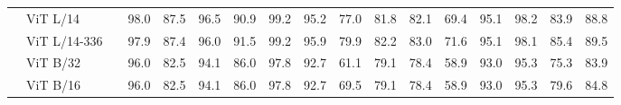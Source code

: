 \documentclass{article} \usepackage{iclr2023_conference,times}
\begin{document}
\begin{table}
{\begin{tabular}{cl|cccccccccccccc|c}
			 & ViT L/14     &  & 98.0                                       & 87.5                                        & 96.5                                          & 90.9                                    & 99.2                                       & 95.2                                       & 77.0                                        & 81.8                                      & 82.1                                   & 69.4                                        & 95.1                                    & 98.2                                       & 83.9                                        & 88.8                                        \\
			 & ViT L/14-336 &  & 97.9                                       & 87.4                                        & 96.0                                          & 91.5                                    & 99.2                                       & 95.9                                       & 79.9                                        & 82.2                                      & 83.0                                   & 71.6                                        & 95.1                                    & 98.1                                       & 85.4                                        & 89.5                                        \\ \midrule \multirow{4}{0em}{\rotatebox[origin=c]{90}{CLIP-R}}
			 & ViT B/32     &  & 96.0                                       & 82.5                                        & 94.1                                          & 86.0                                    & 97.8                                       & 92.7                                       & 61.1                                        & 79.1                                      & 78.4                                   & 58.9                                        & 93.0                                    & 95.3                                       & 75.3                                        & 83.9                                        \\
			 & ViT B/16     &  & 96.0                                       & 82.5                                        & 94.1                                          & 86.0                                    & 97.8                                       & 92.7                                       & 69.5                                        & 79.1                                      & 78.4                                   & 58.9                                        & 93.0                                    & 95.3                                       & 79.6                                        & 84.8                                        \\

\end{tabular}}
\end{table}
\end{document}
